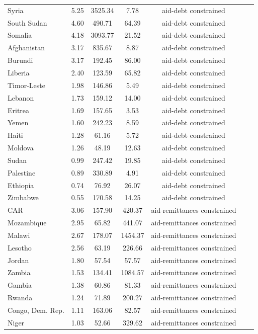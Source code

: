 \documentclass[fleqn,10pt,twocolumn]{wlscirep}
\begin{document}
\begin{longtable}{lrccccc}
	Syria & 5.25 & 3525.34 & 7.78 & aid-debt constrained \\
	South Sudan & 4.60 & 490.71 & 64.39 & aid-debt constrained \\
	Somalia & 4.18 & 3093.77 & 21.52 & aid-debt constrained \\
	Afghanistan & 3.17 & 835.67 & 8.87 & aid-debt constrained \\
	Burundi & 3.17 & 192.45 & 86.00 & aid-debt constrained \\
	Liberia & 2.40 & 123.59 & 65.82 & aid-debt constrained \\
	Timor-Leste & 1.98 & 146.86 & 5.49 & aid-debt constrained \\
	Lebanon & 1.73 & 159.12 & 14.00 & aid-debt constrained \\
	Eritrea & 1.69 & 157.65 & 3.53 & aid-debt constrained \\
	Yemen & 1.60 & 242.23 & 8.59 & aid-debt constrained \\
	Haiti & 1.28 & 61.16 & 5.72 & aid-debt constrained \\
	Moldova & 1.26 & 48.19 & 12.63 & aid-debt constrained \\
	Sudan & 0.99 & 247.42 & 19.85 & aid-debt constrained \\
	Palestine & 0.89 & 330.89 & 4.91 & aid-debt constrained \\
	Ethiopia & 0.74 & 76.92 & 26.07 & aid-debt constrained \\
	Zimbabwe & 0.55 & 170.58 & 14.25 & aid-debt constrained \\
	CAR & 3.06 & 157.90 & 420.37 & aid-remittances constrained \\
	Mozambique & 2.95 & 65.82 & 441.07 & aid-remittances constrained \\
	Malawi & 2.67 & 178.07 & 1454.37 & aid-remittances constrained \\
	Lesotho & 2.56 & 63.19 & 226.66 & aid-remittances constrained \\
	Jordan & 1.80 & 57.54 & 57.57 & aid-remittances constrained \\
	Zambia & 1.53 & 134.41 & 1084.57 & aid-remittances constrained \\
	Gambia & 1.38 & 60.86 & 81.33 & aid-remittances constrained \\
	Rwanda & 1.24 & 71.89 & 200.27 & aid-remittances constrained \\
	Congo, Dem. Rep. & 1.11 & 163.06 & 82.57 & aid-remittances constrained \\
	Niger & 1.03 & 52.66 & 329.62 & aid-remittances constrained \\

\end{longtable}
\end{document}
